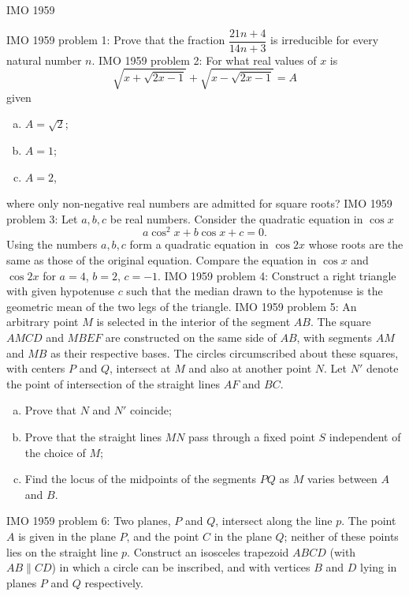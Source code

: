 IMO 1959 

IMO 1959 problem 1:  Prove that the fraction $ \dfrac{21n + 4}{14n + 3}$ is irreducible for every natural number $ n$. 
IMO 1959 problem 2:  For what real values of $x$ is
\[ \sqrt{x+\sqrt{2x-1}}+\sqrt{x-\sqrt{2x-1}}=A \]
given
\begin{enumerate}[a)]
  \item $A=\sqrt{2}$;
  \item $A=1$;
  \item $A=2$,
\end{enumerate}
where only non-negative real numbers are admitted for square roots? 
IMO 1959 problem 3:  Let $a,b,c$ be real numbers. Consider the quadratic equation in $\cos{x}$
\[ a \cos^2{x}+b \cos{x}+c=0. \]
Using the numbers $a,b,c$ form a quadratic equation in $\cos{2x}$ whose roots are the same as those of the original equation. Compare the equation in $\cos{x}$ and $\cos{2x}$ for $a=4$, $b=2$, $c=-1$. 
IMO 1959 problem 4:  Construct a right triangle with given hypotenuse $c$ such that the median drawn to the hypotenuse is the geometric mean of the two legs of the triangle. 
IMO 1959 problem 5:  An arbitrary point $M$ is selected in the interior of the segment $AB$. The square $AMCD$ and $MBEF$ are constructed on the same side of $AB$, with segments $AM$ and $MB$ as their respective bases. The circles circumscribed about these squares, with centers $P$ and $Q$, intersect at $M$ and also at another point $N$. Let $N'$ denote the point of intersection of the straight lines $AF$ and $BC$.
\begin{enumerate}[a)]
  \item Prove that $N$ and $N'$ coincide;
  \item Prove that the straight lines $MN$ pass through a fixed point $S$ independent of the choice of $M$;
  \item Find the locus of the midpoints of the segments $PQ$ as $M$ varies between $A$ and $B$.
\end{enumerate} 
IMO 1959 problem 6:  Two planes, $P$ and $Q$, intersect along the line $p$. The point $A$ is given in the plane $P$, and the point $C$ in the plane $Q$; neither of these points lies on the straight line $p$. Construct an isosceles trapezoid $ABCD$ (with $AB \parallel CD$) in which a circle can be inscribed, and with vertices $B$ and $D$ lying in planes $P$ and $Q$ respectively. 
